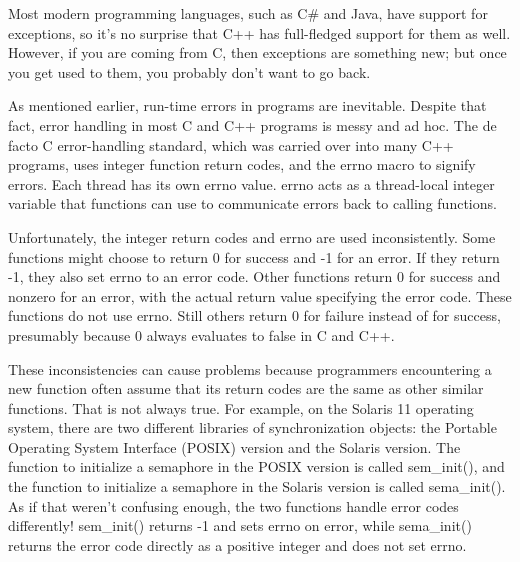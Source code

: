 
Most modern programming languages, such as C\# and Java, have support for exceptions, so it’s no surprise that C++ has full-fledged support for them as well. However, if you are coming from C, then exceptions are something new; but once you get used to them, you probably don’t want to go back.


As mentioned earlier, run-time errors in programs are inevitable. Despite that fact, error handling in most C and C++ programs is messy and ad hoc. The de facto C error-handling standard, which was carried over into many C++ programs, uses integer function return codes, and the errno macro to signify errors. Each thread has its own errno value. errno acts as a thread-local integer variable that functions can use to communicate errors back to calling functions.

Unfortunately, the integer return codes and errno are used inconsistently. Some functions might choose to return 0 for success and -1 for an error. If they return -1, they also set errno to an error code. Other functions return 0 for success and nonzero for an error, with the actual return value specifying the error code. These functions do not use errno. Still others return 0 for failure instead of for success, presumably because 0 always evaluates to false in C and C++.

These inconsistencies can cause problems because programmers encountering a new function often assume that its return codes are the same as other similar functions. That is not always true. For example, on the Solaris 11 operating system, there are two different libraries of synchronization objects: the Portable Operating System Interface (POSIX) version and the Solaris version. The function to initialize a semaphore in the POSIX version is called sem\_init(), and the function to initialize a semaphore in the Solaris version is called sema\_init(). As if that weren’t confusing enough, the two functions handle error codes differently! sem\_init() returns -1 and sets errno on error, while sema\_init() returns the error code directly as a positive integer and does not set errno.

